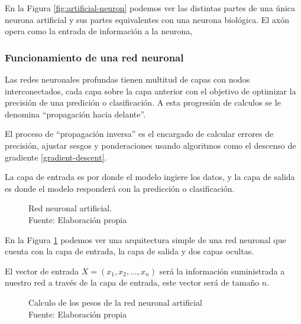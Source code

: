 En la Figura \ref{fig:artificial-neuron} podemos ver las distintas partes de una única neurona artificial y sus partes equivalentes con una neurona biológica. El axón opera como la entrada de información a la neurona,





\subsubsection{Funcionamiento de una red neuronal \label{neural-network}}

Las redes neuronales profundas tienen multitud de capas con nodos interconectados, cada capa sobre la capa anterior con el objetivo de optimizar la precisión de una predición o clasificación. A esta progresión de calculos se le denomina ``propagación hacia delante''.

El proceso de ``propagación inversa'' es el encargado de calcular errores de precisión, ajustar sesgos y ponderaciones usando algoritmos como el descenso de gradiente \ref{gradient-descent}.

La capa de entrada es por donde el modelo ingiere los datos, y la capa de salida es donde el modelo responderá con la predicción o clasificación.

\begin{figure}[H]
    \centering
    \centerline{}
    \caption{Red neuronal artificial.\\Fuente: Elaboración propia}
    \label{fig:artificial-neuronal-network}
\end{figure}

En la Figura \ref{fig:artificial-neuronal-network} podemos ver una arquitectura simple de una red neuronal que cuenta con la capa de entrada, la capa de salida y dos capas ocultas.

El vector de entrada $X = (x_{1}, x_{2}, ..., x_{n})$ será la información suministrada a nuestro red a través de la capa de entrada, este vector será de tamaño $n$.


\begin{figure}[H]
    \centering
    \centerline{}
    \caption{Calculo de los pesos de la red neuronal artificial\\Fuente: Elaboración propia}
    \label{fig:notation}
\end{figure}

